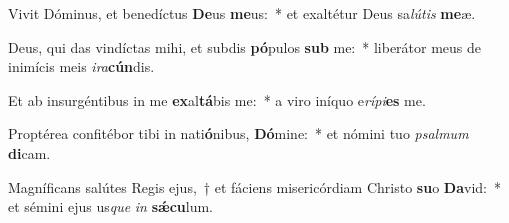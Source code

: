 \item Vivit Dóminus, et benedíctus \textbf{De}us \textbf{me}us:~* et exaltétur Deus sa\textit{lú}\textit{tis} \textbf{me}æ.
\item Deus, qui das vindíctas mihi, et subdis \textbf{pó}pulos \textbf{sub} me:~* liberátor meus de inimícis meis \textit{i}\textit{ra}\textbf{cún}dis.
\item Et ab insurgéntibus in me \textbf{ex}al\textbf{tá}bis me:~* a viro iníquo e\textit{rí}\textit{pi}\textbf{es} me.
\item Proptérea confitébor tibi in nati\textbf{ó}nibus, \textbf{Dó}mine:~* et nómini tuo \textit{psal}\textit{mum} \textbf{di}cam.
\item Magníficans salútes Regis ejus,~† et fáciens misericórdiam Christo \textbf{su}o \textbf{Da}vid:~* et sémini ejus us\textit{que} \textit{in} \textbf{sǽ}\textbf{cu}lum.
